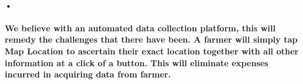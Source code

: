 \documentclass[12pt]{article}
\begin{document}
\paragraph{•}

\paragraph*{We believe with an automated data collection platform, this will remedy the challenges that there have been.
A farmer will simply tap Map Location to ascertain their exact location together with all other information at a click of a button.
This will eliminate expenses incurred in acquiring data from farmer.
 } 
\end{document}
